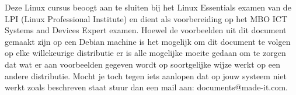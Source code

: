 Deze Linux cursus beoogt aan te sluiten bij het Linux Essentials examen van de LPI (Linux Professional Institute) en dient als voorbereiding op het MBO ICT Systems and Devices Expert examen. Hoewel de voorbeelden uit dit document gemaakt zijn op een Debian machine is het mogelijk om dit document te volgen op elke willekeurige distributie er is alle mogelijke moeite gedaan om te zorgen dat wat er aan voorbeelden gegeven wordt op soortgelijke wijze werkt op een andere distributie. Mocht je toch tegen iets aanlopen dat op jouw systeem niet werkt zoals beschreven staat stuur dan een mail aan: documents@made-it.com.


